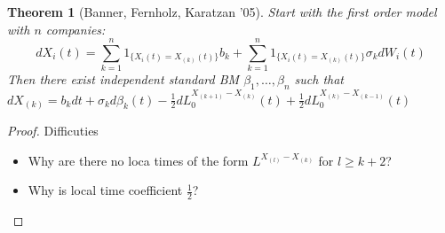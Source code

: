 \documentclass{article} \usepackage[utf8]{inputenc}
\newtheorem{theorem}{Theorem}
\begin{document}
  \begin{theorem}[Banner, Fernholz, Karatzan '05]
    Start with the first order model with $n$ companies:
    $$dX_i(t) = \sum_{k = 1}^n 1_{\{X_i(t) = X_{(k)}(t)\}} b_k + \sum_{k = 1}^n 1_{\{X_i(t) = X_{(k)}(t)\}} \sigma_k dW_i(t)$$
    Then there exist independent standard BM $\beta_1, \ldots, \beta_n$ such that
    $dX_{(k)} = b_k dt + \sigma_k d\beta_k(t) - \frac12 dL_0^{X_{(k+1)} - X_{(k)}}(t) + \frac12 dL_0^{X_{(k)} - X_{(k-1)}}(t)$
  \end{theorem}
  \begin{proof}
    Difficuties
    \begin{itemize}
    \item Why are there no loca times of the form $L^{X_{(l)} - X_{(k)}}$ for $l \ge k+2$?
    \item Why is local time coefficient $\frac12$?
    \end{itemize}
  \end{proof}
\end{document}
